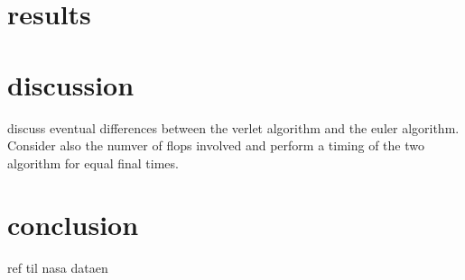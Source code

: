 \documentclass[reprint, english,notitlepage,nofootinbib]{revtex4-1}  %
\begin{document}
\section{results}

\section{discussion}

discuss eventual differences between the verlet algorithm and the euler algorithm. Consider also the numver of flops involved and perform a timing of the two algorithm for equal final times.

\section{conclusion}




\onecolumngrid
\vspace{1cm} %
\newpage

\begin{thebibliography}{}
 ref til nasa dataen

\end{thebibliography}
\end{document}
